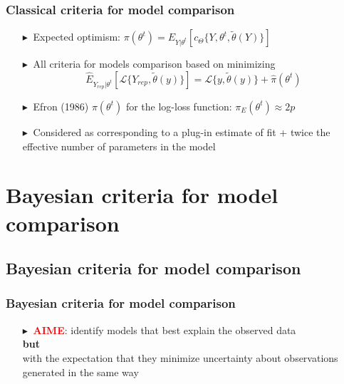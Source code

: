 \documentclass[9pt]{beamer}  %
\newcommand{\bluetri}{\textcolor{Beaverblue}{$\blacktriangleright \ $}}
\begin{document}

\begin{frame}
\frametitle{Classical criteria for model comparison}


\begin{itemize}
    \item[\bluetri] Expected optimism: $\pi(\theta^t) = E_{Y|\theta^t}[c_{\Theta}\{Y,\theta^t,\tilde{\theta}(Y)\}]$
    \vspace{0.2cm} 
    \item[\bluetri] All criteria for models comparison based on minimizing $$\hat{E}_{Y_{rep}|\theta^t}[\mathcal{L}\{Y_{rep},\tilde{\theta}(y)\}] = \mathcal{L}\{y, \tilde{\theta}(y)\} + \hat{\pi}(\theta^t)$$
    \vspace{0.2cm} 
    \item[\bluetri] Efron (1986) $\pi(\theta^t)$ for the log-loss function: $\pi_E(\theta^t) \approx 2p$
    \vspace{0.2cm} 
    \item[\bluetri] Considered as corresponding to a plug-in estimate of fit + twice the effective number of parameters in the model
\end{itemize}


\end{frame}


\section[Bayesian criteria for model comparison]{Bayesian criteria for model comparison}
\subsection*{Bayesian criteria for model comparison}


\begin{frame}
\frametitle{Bayesian criteria for model comparison}

\begin{itemize}
    \item[\bluetri] \textcolor{red}{\bf{AIME}}: identify models that best explain the observed data \\ {\bf but} \\ with the expectation that they minimize uncertainty about observations generated in the same way
\end{itemize}


\end{frame}
\end{document}
